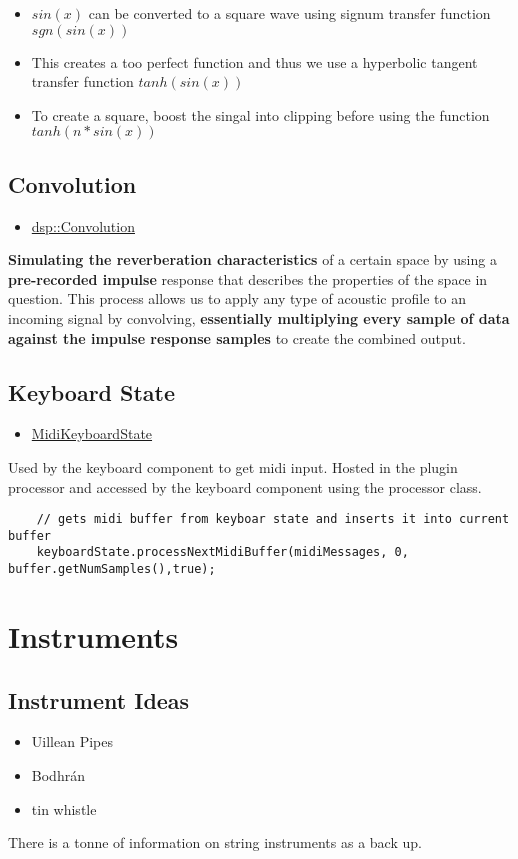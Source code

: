 \documentclass{article}
\begin{document}
	
	\begin{itemize}
		\item $sin(x)$ can be converted to a square wave using signum transfer function $sgn(sin(x))$
		\item This creates a too perfect function and thus we use a hyperbolic tangent transfer function $tanh(sin(x))$
		\item To create a square, boost the singal into clipping before using the function $tanh(n*sin(x))$
	\end{itemize}
	
	\subsection{Convolution}
	\begin{itemize}
		\item \href{https://docs.juce.com/master/classdsp_1_1Convolution.html}{dsp::Convolution}
	\end{itemize}
	\textbf{Simulating the reverberation characteristics} of a certain space by using a \textbf{pre-recorded impulse} response that describes the properties of the space in question. This process allows us to apply any type of acoustic profile to an incoming signal by convolving, \textbf{essentially multiplying every sample of data against the impulse response samples} to create the combined output.
	
	
	\subsection{Keyboard State}
	\begin{itemize}
		\item \href{https://docs.juce.com/develop/classMidiKeyboardState.html}{MidiKeyboardState}
	\end{itemize}
	Used by the keyboard component to get midi input. Hosted in the plugin processor and accessed by the keyboard component using the processor class.
	\begin{lstlisting}
	// gets midi buffer from keyboar state and inserts it into current buffer
	keyboardState.processNextMidiBuffer(midiMessages, 0, buffer.getNumSamples(),true);
	\end{lstlisting}


\section{Instruments}
	\subsection{Instrument Ideas}
	\begin{itemize}
		\item Uillean Pipes
		\item Bodhrán
		\item tin whistle
	\end{itemize}
	There is a tonne of information on string instruments as a back up.
	
\end{document}
